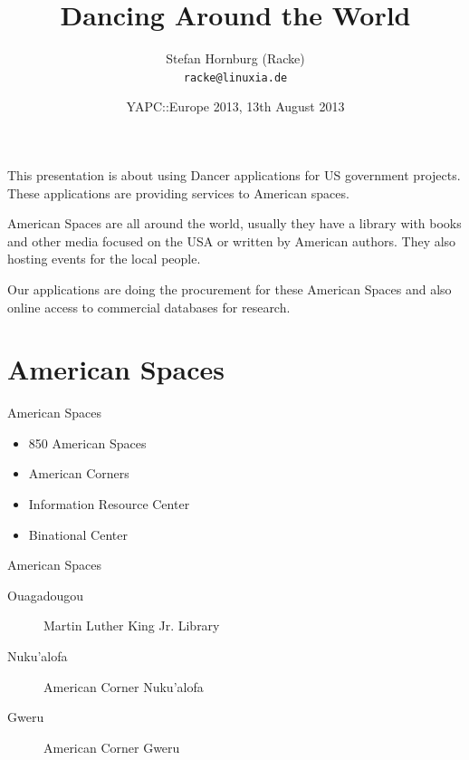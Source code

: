 \usepackage[utf8]{inputenc}
\usepackage[T1]{fontenc}
\usepackage{mathptmx}
\usepackage[scaled=.90]{helvet}
\usepackage{courier}
\usepackage{caption}
\captionsetup{labelformat=empty,labelsep=none}
\usepackage{beamerthemesplit}
\usepackage{verbatim}
\usepackage{hyperref}
\usepackage{listings}
\lstset{language=Perl,basicstyle=\normalsize,tabsize=3,showstringspaces=false}

\title{Dancing Around the World}
\author[racke]{Stefan Hornburg (Racke)\\ \texttt{racke@linuxia.de}}
\date{YAPC::Europe 2013, 13th August 2013}


\maketitle{}

\begin{frame}
  \titlepage
\end{frame}

\tableofcontents

This presentation is about using Dancer applications for US government
projects. These applications are providing services to American spaces.

American Spaces are all around the world, usually they have a library
with books and other media focused on the USA or written by American
authors. They also hosting events for the local people.

Our applications are doing the procurement for these American Spaces
and also online access to commercial databases for research.

\section{American Spaces}

\begin{frame}{American Spaces}
\begin{itemize}
\item 850 American Spaces
\item American Corners
\item Information Resource Center
\item Binational Center

\end{itemize}
\end{frame}

\begin{frame}{American Spaces}
\begin{description}
\item[Ouagadougou] Martin Luther King Jr. Library
\item[Nuku'alofa] American Corner Nuku'alofa

\item[Gweru] American Corner Gweru

\end{description}
\end{frame}

